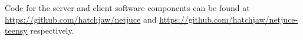 Code for the server and client software components can be found at
\url{https://github.com/hatchjaw/netjuce} and
\url{https://github.com/hatchjaw/netjuce-teensy} respectively.

